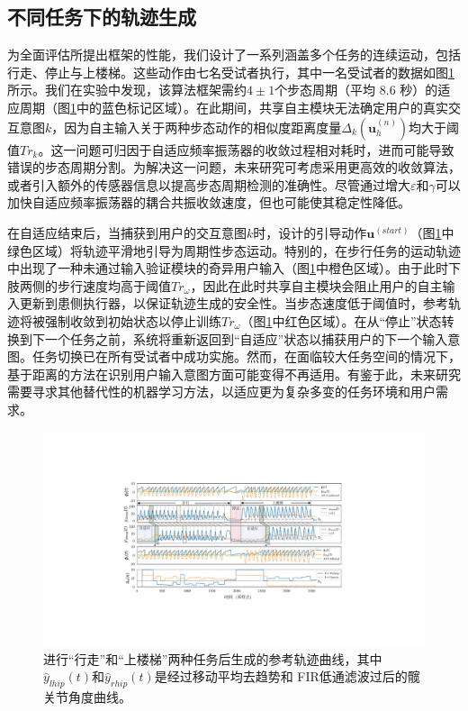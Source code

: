 \subsection{不同任务下的轨迹生成}为全面评估所提出框架的性能，我们设计了一系列涵盖多个任务的连续运动，包括行走、停止与上楼梯。这些动作由七名受试者执行，其中一名受试者的数据如图\ref{fig:5-6}所示。我们在实验中发现，该算法框架需约$4\pm 1$个步态周期（平均 8.6 秒）的适应周期（图\ref{fig:5-6}中的蓝色标记区域）。在此期间，共享自主模块无法确定用户的真实交互意图${k}$，因为自主输入关于两种步态动作的相似度距离度量${\Delta _k}(\pmb{u}_h^{(n)})$均大于阈值$T{r_k}$。这一问题可归因于自适应频率振荡器的收敛过程相对耗时，进而可能导致错误的步态周期分割。为解决这一问题，未来研究可考虑采用更高效的收敛算法，或者引入额外的传感器信息以提高步态周期检测的准确性。尽管通过增大$\varepsilon $和$\gamma $可以加快自适应频率振荡器的耦合共振收敛速度，但也可能使其稳定性降低。

在自适应结束后，当捕获到用户的交互意图${k}$时，设计的引导动作${\pmb{u}^{(start)}}$（图\ref{fig:5-6}中绿色区域）将轨迹平滑地引导为周期性步态运动。特别的，在步行任务的运动轨迹中出现了一种未通过输入验证模块的奇异用户输入（图\ref{fig:5-6}中橙色区域）。由于此时下肢两侧的步行速度均高于阈值$T{r_\omega}$，因此在此时共享自主模块会阻止用户的自主输入更新到患侧执行器，以保证轨迹生成的安全性。当步态速度低于阈值时，参考轨迹将被强制收敛到初始状态以停止训练$T{r_\omega }$（图\ref{fig:5-6}中红色区域）。在从``停止''状态转换到下一个任务之前，系统将重新返回到``自适应''状态以捕获用户的下一个输入意图。任务切换已在所有受试者中成功实施。然而，在面临较大任务空间的情况下，基于距离的方法在识别用户输入意图方面可能变得不再适用。有鉴于此，未来研究需要寻求其他替代性的机器学习方法，以适应更为复杂多变的任务环境和用户需求。
\begin{figure}[!t]
  \centering\includegraphics[width=1\textwidth]{figures/5-Fig-6.pdf}
  \caption{进行“行走”和“上楼梯”两种任务后生成的参考轨迹曲线，其中${\hat y_{lhip}}(t)$和${\hat y_{rhip}}(t)$是经过移动平均去趋势和 FIR低通滤波过后的髋关节角度曲线。}
  \label{fig:5-6}
\end{figure}

